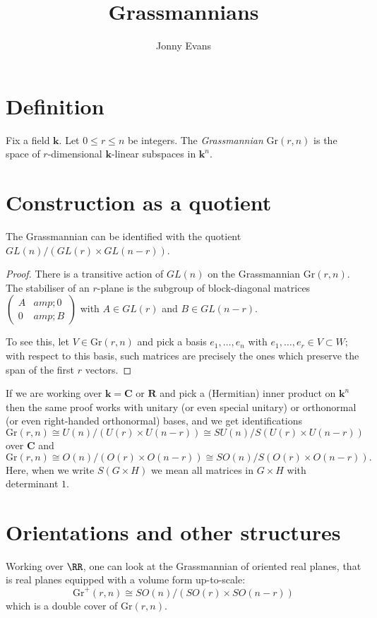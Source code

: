 \documentclass{amsart}
\title{Grassmannians}
\author{Jonny Evans}
\begin{document}
\section{Definition}
\begin{Definition}
Fix a field $\mathbf{k}$. Let $0\leq r\leq n$ be integers. The {\em Grassmannian} $\mathrm{Gr}(r,n)$ is the space of $r$-dimensional $\mathbf{k}$-linear subspaces in $\mathbf{k}^n$.
\end{Definition}

\section{Construction as a quotient}
\begin{Lemma}
The Grassmannian can be identified with the quotient $GL(n)/\left(GL(r)\times GL(n-r)\right)$.
\end{Lemma}
\begin{proof}
There is a transitive action of $GL(n)$ on the Grassmannian $\mathrm{Gr}(r,n)$. The stabiliser of an $r$-plane is the subgroup of block-diagonal matrices $\left(\begin{array}{cc}A &amp; 0 \\ 0 &amp; B\end{array}\right)$ with $A\in GL(r)$ and $B\in GL(n-r)$.

To see this, let $V\in\mathrm{Gr}(r,n)$ and pick a basis $e_1,\ldots,e_n$ with $e_1,\ldots,e_r\in V\subset W$; with respect to this basis, such matrices are precisely the ones which preserve the span of the first $r$ vectors.
\end{proof}

If we are working over $\mathbf{k}=\mathbf{C}$ or $\mathbf{R}$ and pick a (Hermitian) inner product on $\mathbf{k}^n$ then the same proof works with unitary (or even special unitary) or orthonormal (or even right-handed orthonormal) bases, and we get identifications
\[\mathrm{Gr}(r,n)\cong U(n)/\left(U(r)\times U(n-r)\right)\cong SU(n)/S\left(U(r)\times U(n-r)\right)\]
over $\mathbf{C}$ and
\[\mathrm{Gr}(r,n)\cong O(n)/\left(O(r)\times O(n-r)\right)\cong SO(n)/S\left(O(r)\times O(n-r)\right).\]
Here, when we write $S(G\times H)$ we mean all matrices in $G\times H$ with determinant $1$.

\section{Orientations and other structures}

Working over $\RR$, one can look at the Grassmannian of oriented real planes, that is real planes equipped with a volume form up-to-scale:
\[\mathrm{Gr}^+(r,n)\cong SO(n)/\left(SO(r)\times SO(n-r)\right)\]
which is a double cover of $\mathrm{Gr}(r,n)$.
\end{document}

